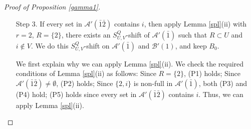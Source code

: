 \documentclass[a4paper,11pt]{article}
\newcommand{\m}{\mathcal}
\begin{document}
\begin{proof}[Proof of Proposition \ref{gamma1}]
\begin{itemize}
We first explain why we can apply Lemma \ref{spl}(i). We check the required conditions of Lemma \ref{spl}(i) as follows: Since $\m A'(\bar1)$ is $2$-shifted, if $S_{U,V}(\m A'(\bar1))\ne \m A'(\bar1)$ for some $U$ with $2\in U$,
then $|V|\ge 2$, and hence (P1) holds; Since $A\in \m A'(\bar 1\bar 2)$ with $i\not\in A$, $A\cap \{2,i\}=\emptyset$, (P2) holds; Since $\{2,i\}$ is non-full in $\m A'(\bar1)$, (P3) holds.  Thus, we can apply 
Lemma \ref{spl}(i). The $S_{U,V}^Q$-shift of $\m A'(\bar1)$ with $i\in U$ is also of $(\m A', \m B')$. 

Put $\m R_2:=S_{U,V}^Q(\m A')$ and $\m T_2:=S_{U,V}^Q(\m B')$.
By Lemma \ref{SUV'}, $\m R_2$ and $\m T_2$ are cross-intersecting. 
Note that $\m A'(\bar1)$ and $\m B'(1)$ are $2$-shifted, and $2\in R\subset U$, by  Proposition \ref{suvcenter}, if $S_{U,V}^Q(\m A'(\bar1))$ or $S_{U,V}^Q(\m B'(1))$ is a star, then $2$ is a center. 
Since $i\in U\cap B_0$, $B_0$ is stable. An argument analogous to that in Step 1 shows that (\ref{6-17-3}) also holds for $S_{U,V}^Q(\m A')$, together with $B_0\in S_{U,V}^Q(\m B')$, neither $\m R_2$ nor $\m T_2$ is a star. Thus, $\m R_2$ and $\m T_2$ are non-trivial cross-intersecting.  

We repeatedly do such $S_{U,V}^Q$-shifts for all possible $(U,V)$ with $\{2,i\}\subset U$.
After finishing Step 2, we turn to Step 3. 
Now we are in the situation: $\{2,i\}$ is non-full, and every set in $\m A'(\bar 1\bar 2)$ contains $i$. Clearly, $\m A'(\bar 1\bar 2)\ne \emptyset$ since otherwise, we stop here. 

\item[Step 3.] 
If every set in $\m A'(\bar 1\bar 2)$ contains $i$, then apply Lemma \ref{spl}(ii) with $r=2$, $R=\{2\}$, there exists an $S_{U,V}^Q$-shift of $\m A'(\bar1)$ such that $R\subset U$ and $i\not\in V$. We do this $S_{U,V}^Q$-shift on $\m A'(\bar1)$ and $ \m B'(1)$, and keep $B_0$. 

We first explain why we can apply Lemma \ref{spl}(ii). We check the required conditions of Lemma \ref{spl}(ii) as follows: Since $R=\{2\}$, (P1) holds; Since $\m A'(\bar 1\bar 2)\ne \emptyset$, (P2) holds; Since $\{2,i\}$ is non-full in $\m A'(\bar1)$, both (P3) and (P4) hold; (P5) holds since every set in $\m A'(\bar 1\bar 2)$ contains $i$.
Thus, we can apply 
Lemma \ref{spl}(ii). 


\end{itemize}
\end{proof}
\end{document}
